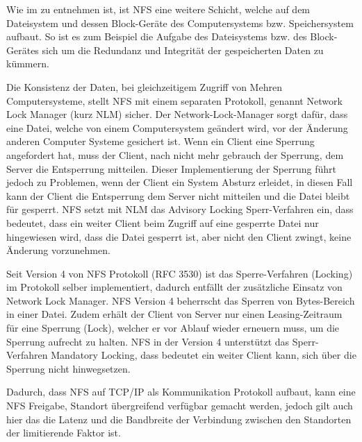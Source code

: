Wie im  zu entnehmen ist, ist NFS eine weitere Schicht, welche auf dem Dateisystem und dessen Block-Geräte des Computersystems bzw. Speichersystem aufbaut. So ist es zum Beispiel die Aufgabe des Dateisystems bzw. des Block-Gerätes sich um die Redundanz und Integrität der gespeicherten Daten zu kümmern. 

Die Konsistenz der Daten, bei gleichzeitigem Zugriff von Mehren Computersysteme, stellt NFS mit einem separaten Protokoll, genannt Network Lock Manager (kurz NLM) sicher. Der Network-Lock-Manager sorgt dafür, dass eine Datei, welche von einem Computersystem geändert wird, vor der Änderung anderen Computer Systeme gesichert ist. Wenn ein Client eine Sperrung angefordert hat, muss der Client, nach nicht mehr gebrauch der Sperrung, dem Server die Entsperrung mitteilen. Dieser Implementierung der Sperrung führt jedoch zu Problemen, wenn der Client ein System Absturz erleidet, in diesen Fall kann der Client die Entsperrung dem Server nicht mitteilen und die Datei bleibt für gesperrt.
NFS setzt mit NLM das Advisory Locking Sperr-Verfahren ein, dass bedeutet, dass ein weiter Client beim Zugriff auf eine gesperrte Datei nur hingewiesen wird, dass die Datei gesperrt ist, aber nicht den Client zwingt, keine Änderung vorzunehmen.\cite{Stern2001}


Seit Version 4 von NFS Protokoll (\gls{RFC} 3530) ist das Sperre-Verfahren (Locking) im Protokoll selber implementiert, dadurch entfällt der zusätzliche Einsatz von Network Lock Manager. NFS Version 4 beherrscht das Sperren von Bytes-Bereich in einer Datei. Zudem erhält der Client von Server nur einen Leasing-Zeitraum für eine Sperrung (Lock), welcher er vor Ablauf wieder erneuern muss, um die Sperrung aufrecht zu halten. NFS in der Version 4 unterstützt das Sperr-Verfahren Mandatory Locking, dass bedeutet ein weiter Client kann, sich über die Sperrung nicht hinwegsetzen.\cite{Callaghan2003}

Dadurch, dass NFS auf TCP/IP als Kommunikation Protokoll aufbaut, kann eine NFS Freigabe, Standort übergreifend verfügbar gemacht werden, jedoch gilt auch hier das die Latenz und die Bandbreite der Verbindung zwischen den Standorten der limitierende Faktor ist.

